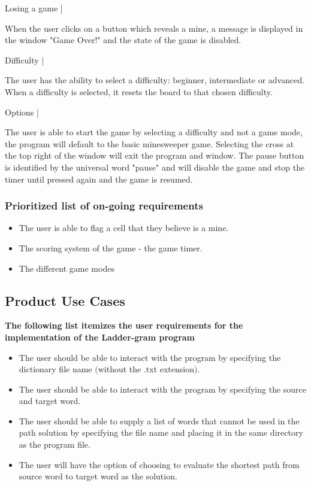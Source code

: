 \documentclass[12pt, a4]{report}
\begin{document}
		Losing a game |
		\par When the user clicks on a button which reveals a mine, a message is displayed in the window "Game Over!" and the state of the game is disabled. 
		
		Difficulty |
		\par The user has the ability to select a difficulty: beginner, intermediate or advanced. When a difficulty is selected, it resets the board to that chosen difficulty. 
		
		Options |
		\par The user is able to start the game by selecting a difficulty and not a game mode, the program will default to the basic minesweeper game. Selecting the cross at the top right of the window will exit the program and window. The pause button is identified by the universal word "pause" and will disable the game and stop the timer until pressed again and the game is resumed.
		
		\subsubsection{Prioritized list of on-going requirements}
		\begin{itemize}
			\item The user is able to flag a cell that they believe is a mine.
			\item The scoring system of the game - the game timer. 
			\item The different game modes
		\end{itemize}	
	
	
	\subsection{Product Use Cases}
	\textbf{The following list itemizes the user requirements for the implementation of the Ladder-gram program}
	\begin{itemize}
		\item The user should be able to interact with the program by specifying the dictionary file name $($without the .txt extension$)$.
		\item The user should be able to interact with the program by specifying the source and target word.
		\item The user should be able to supply a list of words that cannot be used in the path solution by specifying the file name and placing it in the same directory as the program file.
		\item The user will have the option of choosing to evaluate the shortest path from source word to target word as the solution.
	\end{itemize}
	
\end{document}
